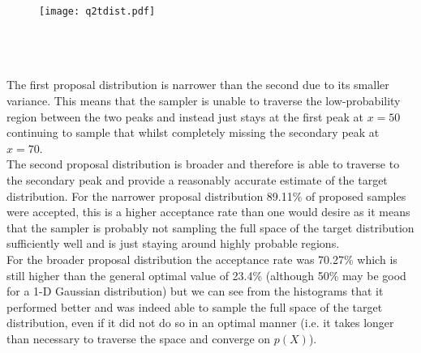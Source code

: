 \documentclass[paper=a4, fontsize=11pt]{scrartcl} %
\numberwithin{equation}{section} %
\numberwithin{figure}{section} %
\numberwithin{table}{section} %
\begin{document}
\begin{figure}[!h]
\centering
\texttt{[image: q2tdist.pdf]}%
\end{figure}
\
\\

 
\\
\\

The first proposal distribution is narrower than the second due to its smaller variance. This means that the sampler is unable to traverse the low-probability region between the two peaks and instead just stays at the first peak at $x=50$ continuing to sample that whilst completely missing the secondary peak at $x=70$.\\

The second proposal distribution is broader and therefore is able to traverse to the secondary peak and provide a reasonably accurate estimate of the target distribution. For the narrower proposal distribution 89.11\% of proposed samples were accepted, this is a higher acceptance rate than one would desire as it means that the sampler is probably not sampling the full space of the target distribution sufficiently well and is just staying around highly probable regions.\\  

For the broader proposal distribution the acceptance rate was 70.27\% which is still higher than the general optimal value of 23.4\% (although 50\% may be good for a 1-D Gaussian distribution) but we can see from the histograms that it performed better and was indeed able to sample the full space of the target distribution, even if it did not do so in an optimal manner (i.e. it takes longer than necessary to traverse the space and converge on $p(X)$).\\


 
\\
\end{document}
